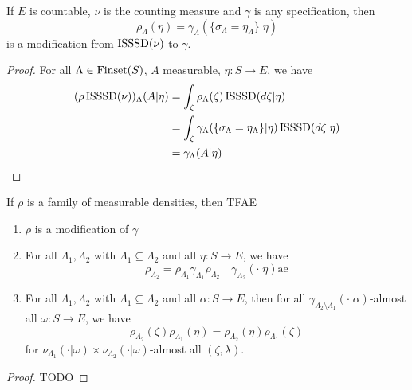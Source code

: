 \begin{lemma}
    \label{lem:exists-modification-countable}

    If $E$ is countable, $\nu$ is the counting measure and $\gamma$ is any specification, then
    $$\rho_\Lambda(\eta) = \gamma_\Lambda(\{\sigma_\Lambda = \eta_\Lambda\} | \eta)$$
    is a modification from $\operatorname{ISSSD}(\nu)$ to $\gamma$.
\end{lemma}
\begin{proof}

    For all $\Lambda \in \operatorname{Finset}(S)$, $A$ measurable, $\eta : S \to E$, we have
    \begin{align}
        (\rho\operatorname{ISSSD}(\nu))_\Lambda(A|\eta)
        & = \int_\zeta \rho_\Lambda(\zeta) \operatorname{ISSSD}(d\zeta|\eta) \\
        & = \int_\zeta \gamma_\Lambda(\{\sigma_\Lambda = \eta_\Lambda\} | \eta) \operatorname{ISSSD}(d\zeta|\eta) \\
        & = \gamma_\Lambda(A|\eta)
    \end{align}
\end{proof}

\begin{proposition}
    \label{prop:modification-tfae}

    If $\rho$ is a family of measurable densities, then TFAE
    \begin{enumerate}
        \item $\rho$ is a modification of $\gamma$
        \item For all $\Lambda_1, \Lambda_2$ with $\Lambda_1 \subseteq \Lambda_2$ and all $\eta : S \to E$, we have
        $$\rho_{\Lambda_2} = \rho_{\Lambda_1} \gamma_{\Lambda_1} \rho_{\Lambda_2} \quad \gamma_{\Lambda_2}(\cdot|\eta)\text{ae}$$
        \item For all $\Lambda_1, \Lambda_2$ with $\Lambda_1 \subseteq \Lambda_2$ and all $\alpha : S \to E$, then for all $\gamma_{\Lambda_2 \setminus \Lambda_1}(\cdot|\alpha)$-almost all $\omega : S \to E$, we have
        $$\rho_{\Lambda_2}(\zeta)\rho_{\Lambda_1}(\eta) = \rho_{\Lambda_2}(\eta) \rho_{\Lambda_1}(\zeta)$$
        for $\nu_{\Lambda_1}(\cdot|\omega) \times \nu_{\Lambda_2}(\cdot|\omega)$-almost all $(\zeta, \lambda)$.
    \end{enumerate}
\end{proposition}
\begin{proof}

    TODO
\end{proof}

